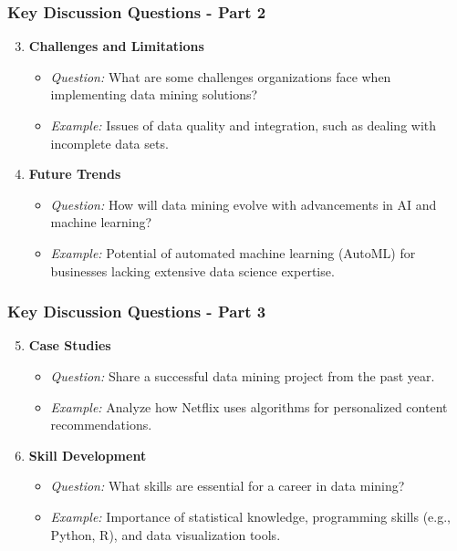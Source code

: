 \documentclass[aspectratio=169]{beamer}
\begin{document}
\begin{frame}[fragile]
    \frametitle{Key Discussion Questions - Part 2}
    \begin{enumerate}
        \setcounter{enumi}{2} %
        \item \textbf{Challenges and Limitations}
            \begin{itemize}
                \item \textit{Question:} What are some challenges organizations face when implementing data mining solutions?
                \item \textit{Example:} Issues of data quality and integration, such as dealing with incomplete data sets.
            \end{itemize}

        \item \textbf{Future Trends}
            \begin{itemize}
                \item \textit{Question:} How will data mining evolve with advancements in AI and machine learning?
                \item \textit{Example:} Potential of automated machine learning (AutoML) for businesses lacking extensive data science expertise.
            \end{itemize}
    \end{enumerate}
\end{frame}

\begin{frame}[fragile]
    \frametitle{Key Discussion Questions - Part 3}
    \begin{enumerate}
        \setcounter{enumi}{4} %
        \item \textbf{Case Studies}
            \begin{itemize}
                \item \textit{Question:} Share a successful data mining project from the past year.
                \item \textit{Example:} Analyze how Netflix uses algorithms for personalized content recommendations.
            \end{itemize}

        \item \textbf{Skill Development}
            \begin{itemize}
                \item \textit{Question:} What skills are essential for a career in data mining?
                \item \textit{Example:} Importance of statistical knowledge, programming skills (e.g., Python, R), and data visualization tools.
            \end{itemize}
    \end{enumerate}
\end{frame}
\end{document}
